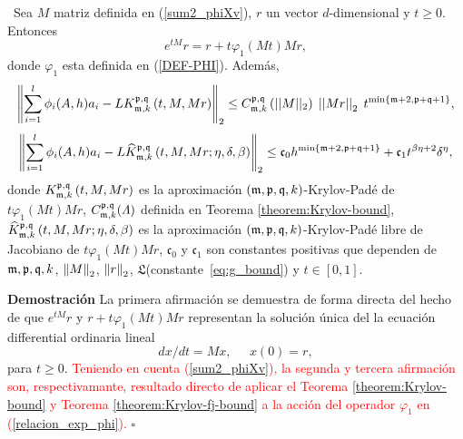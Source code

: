 \begin{theorem} \label{theorem:Krylov-and-Krylov-fj-bounds}
	\cite{naranjo2023computing,naranjo2023RT}~Sea $M$ matriz definida en (\ref{sum2_phiXv}), $r$ un vector $d$-dimensional y $t\geq 0$. Entonces
    \begin{equation} 
    	e^{tM}r = r + t\varphi_1 (Mt)Mr, \label{relacion_exp_phi}
    \end{equation}
	donde $\varphi_1$ esta definida en (\ref{DEF-PHI}). Además,
	\begin{equation}
      \left\Vert\sum\limits_{i=1}^{l}\phi _{i}(A,h)a_{i}-	L K_{\mathfrak{m},k}^{\mathfrak{p},\mathfrak{q}}\left(t, M, Mr \right)
      \right\Vert_2 \leq C_{\mathfrak{m},k}^{\mathfrak{p},\mathfrak{q}}\left(\lvert\lvert M \rvert\rvert_2\right) \;
	  \left\lvert \left\lvert Mr \right\rvert \right\rvert_2 \; t^{\mathrm{min}\left\{ \mathfrak{m}+2,\mathfrak{p}+\mathfrak{q}+1 \right\}}, \label{phi_approx}
	\end{equation}
	\begin{equation}
		\left\Vert \sum\limits_{i=1}^{l}\phi _{i}(A,h)a_{i} - L \widehat{K}_{\mathfrak{m},k}^{\mathfrak{p},\mathfrak{q}}\left(t, M , Mr ; \eta, \delta, \beta \right)
		\right\Vert_2 \leq \mathfrak{c}_0 h^{\min\{\mathfrak{m}+2,\mathfrak{p}+\mathfrak{q}+1\}} + \mathfrak{c}_1 t^{\beta\eta+2}\delta^{\eta}, \label{phi_approx_fj}
	\end{equation}
	donde $K_{\mathfrak{m},k}^{\mathfrak{p},\mathfrak{q}}\left(t, M, Mr \right)$ es la aproximación $(\mathfrak{m} , \mathfrak{p} ,\mathfrak{q} , k)$-Krylov-Padé de $t\varphi_1 (Mt)Mr$,  $C_{\mathfrak{m},k}^{\mathfrak{p},\mathfrak{q}}(\varLambda)$ definida en Teorema \ref{theorem:Krylov-bound}, $\widehat{K}_{\mathfrak{m},k}^{\mathfrak{p},\mathfrak{q}}\left(t, M , Mr ; \eta, \delta, \beta \right)$  es la aproximación $(\mathfrak{m} , \mathfrak{p} ,\mathfrak{q} , k)$-Krylov-Padé libre de Jacobiano de $t\varphi_1 (Mt)Mr$, $\mathfrak{c}_0$ y $\mathfrak{c}_1$ son constantes positivas que dependen de $\mathfrak{m},\mathfrak{p},\mathfrak{q},k$, $\left\lVert M \right\rVert_2$, $\left\lVert r \right\rVert_2$, $\mathfrak{L}$(constante~\ref{eq:g_bound}) y $t \in [0,1]$.
\end{theorem}
\textbf{Demostración} La primera afirmación se demuestra de forma directa del hecho de que $e^{tM}r$ y $r + t\varphi_1 (Mt)Mr$ representan la solución única del la ecuación differential ordinaria lineal
\[ dx/dt= Mx,  \;\;\;\;\; x(0)=r, \]
para $t\geq 0$. \textcolor{red}{Teniendo en cuenta (\ref{sum2_phiXv}), la segunda y tercera afirmación son, respectivamante, resultado directo de aplicar el Teorema \ref{theorem:Krylov-bound} y Teorema \ref{theorem:Krylov-fj-bound} a la acción del operador $\varphi_1$ en (\ref{relacion_exp_phi}).}
$\square$

